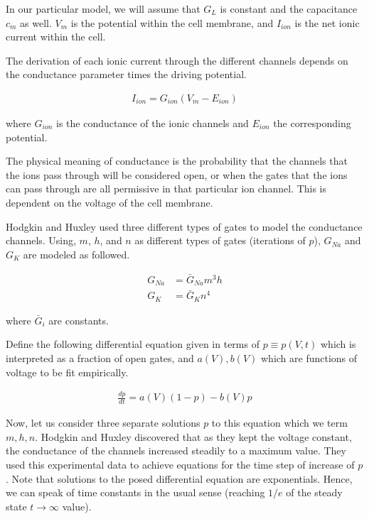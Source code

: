 \documentclass[12]{book}
\newcommand\0{\mathbf{0}}
\newcommand\<{\langle}
\renewcommand\>{\rangle}
\begin{document}
In our particular model, we will assume that $G_L$ is constant and the capacitance $c_m$ as well. $V_m$ is the potential within the cell membrane, and $I_{ion}$ is the net ionic current within the cell.

The derivation of each ionic current through the different channels depends on the conductance parameter times the driving potential.

\begin{align*}
    I_{ion} = G_{ion}(V_{m}-E_{ion})
\end{align*}

where $G_{ion}$ is the conductance of the ionic channels and $E_{ion}$ the corresponding potential.

The physical meaning of conductance is the probability that the channels that the ions pass through will be considered open, or when the gates that the ions can pass through are all permissive in that particular ion channel. This is dependent on the voltage of the cell membrane. 

Hodgkin and Huxley used three different types of gates to model the conductance channels. Using, $m$, $h$, and $n$ as different types of gates (iterations of $p$), $G_{Na}$ and $G_K$ are modeled as followed.

\begin{align*}
    G_{Na} &= \bar{G}_{Na}m^3h\\
    G_{K} &= \bar{G}_{K}n^4
\end{align*}

where $\bar{G}_i$ are constants.

Define the following differential equation given in terms of $p \equiv p(V, t)$ which is interpreted as a fraction of open gates, and $a(V), b(V)$ which are functions of voltage to be fit empirically. 

\begin{align}
\label{eq:dpdt}
    \frac{dp}{dt} = a(V)(1-p) - b(V)p
\end{align}

Now, let us consider three separate solutions $p$ to this equation which we term $m, h, n$. Hodgkin and Huxley discovered that as they kept the voltage constant, the conductance of the channels increased steadily to a maximum value. They used this experimental data to achieve equations for the time step of increase of $p$. Note that solutions to the posed differential equation are exponentials. Hence, we can speak of time constants in the usual sense (reaching $1/e$ of the steady state $t \rightarrow \infty$ value).
\end{document}
